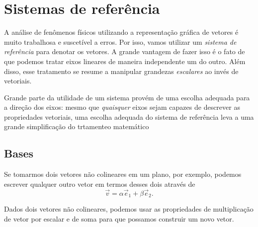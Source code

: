 \section{Sistemas de referência} 

A análise de fenômenos físicos utilizando a representação gráfica de vetores é muito trabalhosa e suscetível a erros. Por isso, vamos utilizar um \emph{sistema de referência} para denotar os vetores. A grande vantagem de fazer isso é o fato de que podemos tratar eixos lineares de maneira independente um do outro. Além disso, esse tratamento se resume a manipular grandezas \emph{escalares} ao invés de vetoriais.

Grande parte da utilidade de um sistema provém de uma escolha adequada para a direção dos eixos: mesmo que \emph{quaisquer} eixos sejam capazes de descrever as propriedades vetoriais, uma escolha adequada do sistema de referência leva a uma grande simplificação do trtamenteo matemático

\subsection{Bases}

Se tomarmos dois vetores não colineares em um plano, por exemplo, podemos escrever qualquer outro vetor em termos desses dois através de
\begin{equation}
  \vec{v} = \alpha \vec{e}_1 + \beta \vec{e}_2.
\end{equation}

\begin{marginfigure}
\centering
{}
\caption{Dados dois vetores não colineares, podemos usar as propriedades de multiplicação de vetor por escalar e de soma para que possamos construir um novo vetor.\label{Fig:VetorObtidoAPartirDeUmaBase}}
\end{marginfigure}

